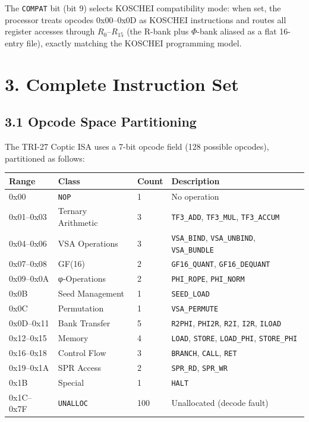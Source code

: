 The \texttt{COMPAT} bit (bit 9) selects KOSCHEI compatibility
mode: when set, the processor treats opcodes 0x00--0x0D as
KOSCHEI instructions and routes all register accesses through
\(R_0\)--\(R_{15}\) (the R-bank plus $\Phi$-bank aliased as a
flat 16-entry file), exactly matching the KOSCHEI programming
model.

\section{3. Complete Instruction Set}\label{fa_71:complete-instruction-set}

\subsection{3.1 Opcode Space Partitioning}\label{fa_71:opcode-space}

The TRI-27 Coptic ISA uses a 7-bit opcode field (128 possible
opcodes), partitioned as follows:

\begin{longtable}[]{@{}llll@{}}
\toprule\noalign{}
Range & Class & Count & Description \\
\midrule\noalign{}
\endhead
\bottomrule\noalign{}
\endlastfoot
0x00 & \texttt{NOP} & 1 & No operation \\
0x01--0x03 & Ternary Arithmetic & 3 & \texttt{TF3\_ADD}, \texttt{TF3\_MUL}, \texttt{TF3\_ACCUM} \\
0x04--0x06 & VSA Operations & 3 & \texttt{VSA\_BIND}, \texttt{VSA\_UNBIND}, \texttt{VSA\_BUNDLE} \\
0x07--0x08 & GF(16) & 2 & \texttt{GF16\_QUANT}, \texttt{GF16\_DEQUANT} \\
0x09--0x0A & φ-Operations & 2 & \texttt{PHI\_ROPE}, \texttt{PHI\_NORM} \\
0x0B & Seed Management & 1 & \texttt{SEED\_LOAD} \\
0x0C & Permutation & 1 & \texttt{VSA\_PERMUTE} \\
0x0D--0x11 & Bank Transfer & 5 & \texttt{R2PHI}, \texttt{PHI2R}, \texttt{R2I}, \texttt{I2R}, \texttt{ILOAD} \\
0x12--0x15 & Memory & 4 & \texttt{LOAD}, \texttt{STORE}, \texttt{LOAD\_PHI}, \texttt{STORE\_PHI} \\
0x16--0x18 & Control Flow & 3 & \texttt{BRANCH}, \texttt{CALL}, \texttt{RET} \\
0x19--0x1A & SPR Access & 2 & \texttt{SPR\_RD}, \texttt{SPR\_WR} \\
0x1B & Special & 1 & \texttt{HALT} \\
0x1C--0x7F & \texttt{UNALLOC} & 100 & Unallocated (decode fault) \\
\end{longtable}

